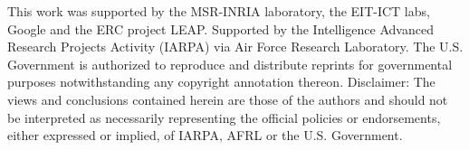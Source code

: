 \begin{acknowledgements}
   This work was supported by the MSR-INRIA laboratory, the EIT-ICT labs, Google and the ERC project LEAP.
   {
   \noindent
   Supported by the Intelligence Advanced Research Projects Activity (IARPA) via Air Force Research Laboratory. The U.S. Government is authorized to reproduce and distribute reprints for governmental purposes notwithstanding any copyright annotation thereon. Disclaimer:  The views and conclusions contained herein are those of the authors and should not be interpreted as necessarily representing the official policies or endorsements, either expressed or implied, of IARPA, AFRL or the U.S. Government.
   }
\end{acknowledgements}




{\footnotesize

}




